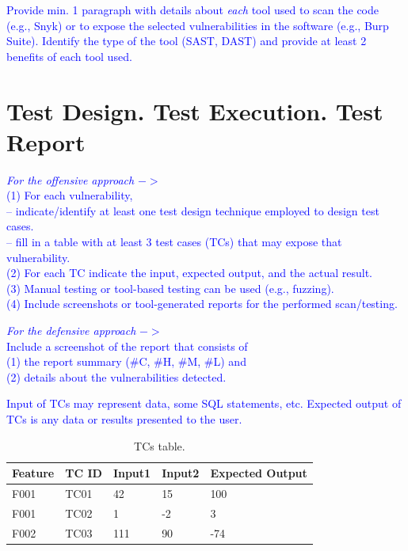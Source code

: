 \documentclass{article}
\begin{document}
\textcolor{blue}{Provide min. 1 paragraph with details about \textit{each} tool used to scan the code (e.g., Snyk) or to expose the selected vulnerabilities in the software (e.g., Burp Suite).
    Identify the type of the tool (SAST, DAST) and provide at least 2 benefits of each tool used.
}


\section{Test Design. Test Execution. Test Report}
\label{}

\textcolor{blue}{\textit{For the offensive approach} $->$\\
    (1) For each vulnerability, \\
    -- indicate/identify at least one test design technique employed to design test cases.\\
    -- fill in a table with at least 3 test cases (TCs) that may expose that vulnerability.\\
    (2) For each TC indicate the input, expected output, and the actual result.\\
    (3) Manual testing or tool-based testing can be used (e.g., fuzzing).\\
    (4) Include screenshots or tool-generated reports for the performed scan/testing.}

\textcolor{blue}{\textit{For the defensive approach} $->$\\
    Include a screenshot of the report that consists of \\
    (1) the report summary (\#C, \#H, \#M, \#L) and \\
    (2) details about the vulnerabilities detected.}

\textcolor{blue}{Input of TCs may represent data, some SQL statements, etc. Expected output of TCs is any data or results presented to the user.}

\begin{table} [htpb]
    \centering
    \begin{tabular}{l|l|l|l|l}
        Feature & TC ID & Input1 & Input2 & Expected Output \\ \hline
        F001    & TC01  & 42     & 15     & 100             \\
        F001    & TC02  & 1      & -2     & 3               \\
        F002    & TC03  & 111    & 90     & -74             \\
    \end{tabular}
    \caption{\label{tab:TCs1}TCs table.}
\end{table}
\end{document}
